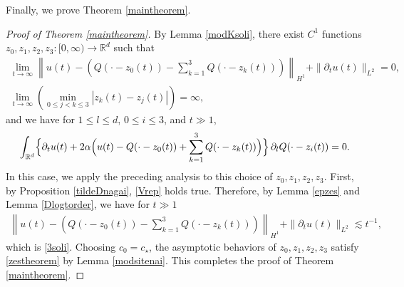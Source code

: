 \documentclass[reqno]{amsart}
\theoremstyle{plain}
\theoremstyle{definition}
\numberwithin{equation}{section}
\newcommand{\1}{\mathbbm{1}}
\begin{document}
Finally, we prove Theorem \ref{maintheorem}.

\begin{proof}[Proof of Theorem \ref{maintheorem}]
By Lemma \ref{modKsoli}, there exist $C^1$ functions $z_0,z_1,z_2,z_3:[0,\infty)\to \mathbb{R}^d$ such that
\begin{align*}
\lim_{t\to\infty}\left\| u(t)-\left(Q(\cdot-z_0(t))-\sum_{k=1}^3 Q(\cdot-z_k(t))\right)\right\|_{H^1}+\|{\partial}_tu(t)\|_{L^2}=0, 
\\
\lim_{t\to\infty}\left(\min_{0\leq j<k\leq 3}|z_k(t)-z_j(t)|\right)=\infty,
\end{align*}
and we have for $1\leq l\leq d$, $0\leq i\leq 3$, and $t\gg 1$,
\begin{align*}
\int_{\mathbb{R}^d} \Bigl\{ {\partial}_tu(t)+2\alpha\Bigl(u(t)-Q(\cdot-z_0(t))+\sum_{k=1}^3 Q(\cdot-z_k(t))\Bigr)\Bigr\}
\, {\partial}_lQ(\cdot-z_i(t))=0.
\end{align*}
In this case, we apply the preceding analysis to this choice of $z_0,z_1,z_2,z_3$.
First, by Proposition \ref{tildeDnagai}, \eqref{Vrep} holds true. Therefore, by Lemma \ref{epzes} and Lemma \ref{Dlogtorder}, we have for $t\gg 1$
\begin{align*}
\left\| u(t)-\left(Q(\cdot-z_0(t))-\sum_{k=1}^3 Q(\cdot-z_k(t))\right)\right\|_{H^1}+\|{\partial}_tu(t)\|_{L^2}\lesssim t^{-1},
\end{align*}
which is \eqref{3soli}. Choosing $c_0=c_{\star}$, the asymptotic behaviors of $z_0,z_1,z_2,z_3$ satisfy \eqref{zestheorem} by Lemma \ref{modsitenai}. This completes the proof of  Theorem \ref{maintheorem}.
\end{proof}
\end{document}
